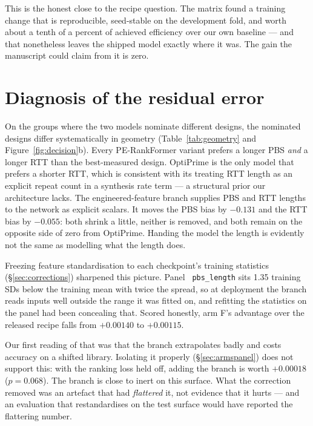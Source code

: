 \documentclass[11pt]{article}
\newcommand{\code}[1]{\texttt{\small\begingroup\hyphenpenalty=10000 #1\endgroup}}
\begin{document}
This is the honest close to the recipe question. The matrix found a training change that is
reproducible, seed-stable on the development fold, and worth about a tenth of a percent of
achieved efficiency over our own baseline --- and that nonetheless leaves the shipped model
exactly where it was. The gain the manuscript could claim from it is zero.

\section{Diagnosis of the residual error}

On the groups where the two models nominate different designs, the nominated designs differ
systematically in geometry (Table~\ref{tab:geometry} and Figure~\ref{fig:decision}b). Every
PE-RankFormer variant prefers a
longer PBS \emph{and} a longer RTT than the best-measured design. OptiPrime is the only model
that prefers a shorter RTT, which is consistent with its treating RTT length as an explicit
repeat count in a synthesis rate term --- a structural prior our architecture lacks. The
engineered-feature branch supplies PBS and RTT lengths to the network as explicit scalars. It
moves the PBS bias by $-0.131$ and the RTT bias by $-0.055$: both shrink a little, neither is
removed, and both remain on the opposite side of zero from OptiPrime. Handing the model the
length is evidently not the same as modelling what the length does.

Freezing feature standardisation to each checkpoint's training statistics
(\S\ref{sec:corrections}) sharpened this picture. Panel \code{pbs\_length} sits 1.35 training
SDs below the training mean with twice the spread, so at deployment the branch reads inputs
well outside the range it was fitted on, and refitting the statistics on the panel had been
concealing that. Scored honestly, arm F's advantage over the released recipe falls from
$+0.00140$ to $+0.00115$.

Our first reading of that was that the branch extrapolates badly and costs accuracy on a
shifted library. Isolating it properly (\S\ref{sec:armspanel}) does not support this: with
the ranking loss held off, adding the branch is worth $+0.00018$ ($p = 0.068$). The branch is
close to inert on this surface. What the correction removed was an artefact that had
\emph{flattered} it, not evidence that it hurts --- and an evaluation that restandardises on
the test surface would have reported the flattering number.
\end{document}
